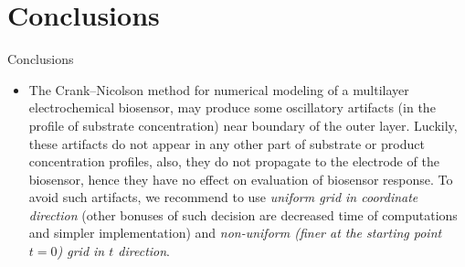 \documentclass[hyperref={breaklinks=true},fleqn,mathserif]{beamer}
\begin{document}
\section{Conclusions}

\begin{frame}{Conclusions}

\begin{block}{}
\begin{itemize}

\item
The Crank--Nicolson method for numerical modeling of a multilayer electrochemical biosensor,
may produce some oscillatory artifacts (in the profile of substrate concentration) near boundary of the outer layer.
Luckily, these artifacts do not appear in any other part of substrate or product concentration profiles, also, they do not propagate to the electrode of the biosensor,
hence they have no effect on evaluation of biosensor response.
To avoid such artifacts,
we recommend to use \emph{uniform grid in coordinate direction} (other bonuses of such decision are decreased time of computations and simpler implementation)
and \emph{non-uniform (finer at the starting point $t=0$) grid in $t$ direction}.

\end{itemize}
\end{block}

\end{frame}
\end{document}
